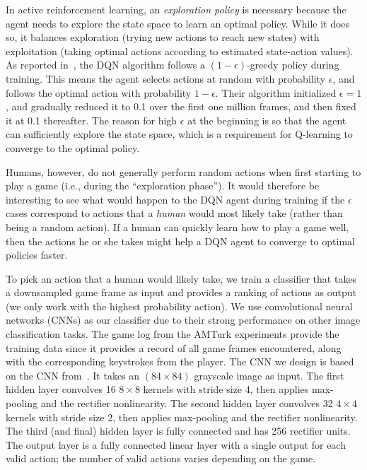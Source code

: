\documentclass[letterpaper, 10 pt, conference]{ieeeconf}  %
\begin{document}
In active reinforcement learning, an \emph{exploration policy} is necessary because the agent needs
to explore the state space to learn an optimal policy. While it does so, it balances exploration
(trying new actions to reach new states) with exploitation (taking optimal actions according to
estimated state-action values). As reported in~\cite{mnih-dqn-2015}, the DQN algorithm follows a
$(1-\epsilon)$-greedy policy during training. This means the agent selects actions at random with
probability $\epsilon$, and follows the optimal action with probability $1-\epsilon$. Their
algorithm initialized $\epsilon=1$, and gradually reduced it to 0.1 over the first one million
frames, and then fixed it at 0.1 thereafter. The reason for high $\epsilon$ at the beginning is so
that the agent can sufficiently explore the state space, which is a requirement for Q-learning to
converge to the optimal policy.

Humans, however, do not generally perform random actions when first starting to play a game (i.e.,
during the ``exploration phase''). It would therefore be interesting to see what would happen to the
DQN agent during training if the $\epsilon$ cases correspond to actions that a \emph{human} would
most likely take (rather than being a random action). If a human can quickly learn how to play a
game well, then the actions he or she takes might help a DQN agent to converge to optimal policies
faster.

To pick an action that a human would likely take, we train a classifier that takes a downsampled
game frame as input and provides a ranking of actions as output (we only work with the highest
probability action). We use convolutional neural networks (CNNs) as our classifier due to their
strong performance on other image classification tasks.  The game log from the AMTurk experiments
provide the training data since it provides a record of all game frames encountered, along with the
corresponding keystrokes from the player. The CNN we design is based on the CNN
from~\cite{mnih-atari-2013}. It takes an $(84\times 84)$ grayscale image as input. The first hidden
layer convolves 16 $8\times 8$ kernels with stride size 4, then applies max-pooling and the
rectifier nonlinearity. The second hidden layer convolves 32 $4\times 4$ kernels with stride size 2,
then applies max-pooling and the rectifier nonlinearity. The third (and final) hidden layer is fully
connected and has 256 rectifier units. The output layer is a fully connected linear layer with a
single output for each valid action; the number of valid actions varies depending on the game.
\end{document}
